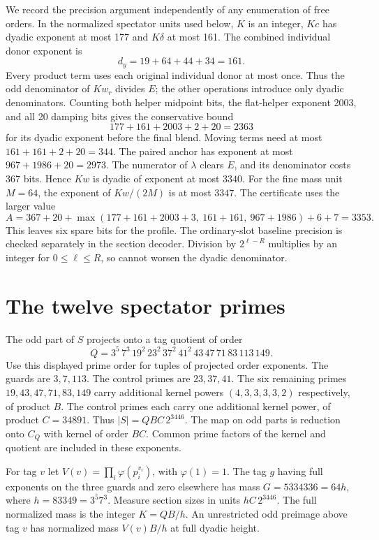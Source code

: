 \documentclass[11pt]{article}
\numberwithin{equation}{section}
\theoremstyle{definition}
\theoremstyle{remark}
\begin{document}
We record the precision argument independently of any enumeration of
free orders.  In the normalized spectator units used below, $K$ is an
integer, $Kc$ has dyadic exponent at most 177 and $K\delta$ at most 161.
The combined individual donor exponent is
\[
 d_y=19+64+44+34=161.
\]
Every product term uses each original individual donor at most once.
Thus the odd denominator of $Kw_r$ divides $E$; the other operations
introduce only dyadic denominators.  Counting both helper midpoint bits,
the flat-helper exponent 2003, and all 20 damping bits gives the
conservative bound
\[
 177+161+2003+2+20=2363
\]
for its dyadic exponent before the final blend.  Moving terms need
at most $161+161+2+20=344$.  The paired anchor has exponent at most
$967+1986+20=2973$.  The numerator of $\lambda$ clears $E$, and its
denominator costs 367 bits.  Hence $Kw$ is dyadic of exponent at most
$3340$.  For the fine mass unit $M=64$, the exponent of $Kw/(2M)$ is
at most $3347$.  The certificate uses the larger value
\begin{equation}\label{h100:fine-precision}
 A=367+20+
 \max(177+161+2003+3,\ 161+161,\ 967+1986)+6+7=3353.
\end{equation}
This leaves six spare bits for the profile.  The ordinary-slot baseline
precision is checked separately in the section decoder.  Division by
$2^{\ell-R}$ multiplies by an integer for $0\le\ell\le R$, so cannot
worsen the dyadic denominator.

\section{The twelve spectator primes}\label{h100:spectator}

The odd part of \(S\) projects onto a tag quotient of order \[
 Q=3^5\,7^3\,19^2\,23^2\,37^2\,41^2\,43\,47\,71\,83\,113\,149 .
\] Use this displayed prime order for tuples of projected order exponents. The guards are \(3,7,113\). The control primes are \(23,37,41\). The six remaining primes \(19,43,47,71,83,149\) carry additional kernel powers \((4,3,3,3,3,2)\) respectively, of product \(B\). The control primes each carry one additional kernel power, of product \(C=34891\). Thus \(|S|=QBC\,2^{3446}\). The map on odd parts is reduction onto \(C_Q\) with kernel of order \(BC\). Common prime factors of the kernel and quotient are included in these exponents.

For tag \(v\) let \(V(v)=\prod_i\varphi(p_i^{v_i})\), with \(\varphi(1)=1\). The tag \(g\) having full exponents on the three guards and zero elsewhere has mass \(G=5334336=64h\), where \(h=83349=3^5 7^3\). Measure section sizes in units \(hC\,2^{3446}\). The full normalized mass is the integer \(K=QB/h\). An unrestricted odd preimage above tag \(v\) has normalized mass \(V(v)B/h\) at full dyadic height.
\end{document}
